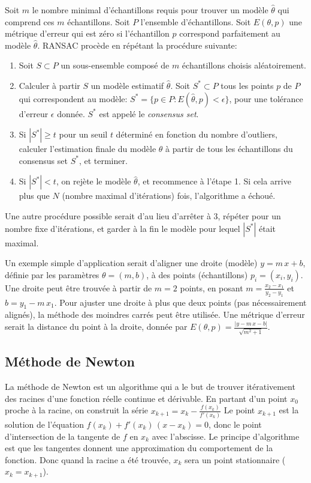 \documentclass[a4paper,10pt]{scrreprt}
\begin{document}
Soit $m$ le nombre minimal d'échantillons requis pour trouver un modèle $\hat{\theta}$ qui comprend ces $m$ échantillons. Soit $P$ l'ensemble d'échantillons. Soit $E(\theta, p)$ une métrique d'erreur qui est zéro si l'échantillon $p$ correspond parfaitement au modèle $\hat{\theta}$. RANSAC procède en répétant la procédure suivante:
\begin{enumerate}
	\item Soit $S \subset P$ un sous-ensemble composé de $m$ échantillons choisis aléatoirement.
	\item Calculer à partir $S$ un modèle estimatif $\hat{\theta}$. Soit $S^* \subset P$ tous les points $p$ de $P$ qui correspondent au modèle: $S^* = \{ p \in P : E(\hat{\theta}, p) < \epsilon \}$, pour une tolérance d'erreur $\epsilon$ donnée. $S^*$ est appelé le \emph{consensus set}.
	\item Si $|S^*| \geq t$ pour un seuil $t$ déterminé en fonction du nombre d'outliers, calculer l'estimation finale du modèle $\theta$ à partir de tous les échantillons du consensus set $S^*$, et terminer.
	\item Si $|S^*| < t$, on rejète le modèle $\hat{\theta}$, et recommence à l'étape 1. Si cela arrive plus que $N$ (nombre maximal d'itérations) fois, l'algorithme a échoué.
\end{enumerate}
Une autre procédure possible serait d'au lieu d'arrêter à 3, répéter pour un nombre fixe d'itérations, et garder à la fin le modèle pour lequel $|S^*|$ était maximal. 

Un exemple simple d'application serait d'aligner une droite (modèle) $y = m \, x + b$, définie par les paramètres $\theta = (m,b)$, à des points (échantillons) $p_i = (x_i,y_i)$. Une droite peut être trouvée à partir de $m = 2$ points, en posant $m = \frac{x_2 - x_1}{y_2 - y_1}$ et $b = y_1 - m \, x_1$. Pour ajuster une droite à plus que deux points (pas nécessairement alignés), la méthode des moindres carrés peut être utilisée. Une métrique d'erreur serait la distance du point à la droite, donnée par $E(\theta, p) = \frac{|y - m\,x - b|}{\sqrt{m^2 + 1}}$.

\subsection{Méthode de Newton} \label{sec:newton}
La méthode de Newton est un algorithme qui a le but de trouver itérativement des racines d'une fonction réelle continue et dérivable. En partant d'un point $x_0$ proche à la racine, on construit la série $x_{k+1} = x_{k} - \frac{f(x_k)}{f'(x_k)}$ Le point $x_{k+1}$ est la solution de l'équation $f(x_k) + f'(x_k) \, (x - x_k) = 0$, donc le point d'intersection de la tangente de $f$ en $x_k$ avec l'abscisse. Le principe d'algorithme est que les tangentes donnent une approximation du comportement de la fonction. Donc quand la racine a été trouvée, $x_k$ sera un point stationnaire ($x_k = x_{k+1}$).
\end{document}
